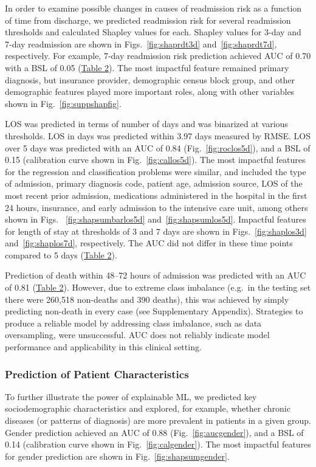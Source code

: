 In order to examine possible changes in causes of readmission risk as a function of time from discharge, 
we predicted readmission risk for several readmission thresholds and calculated Shapley values for each.\@
Shapley values for 3-day and 7-day readmission are shown in Figs.\ 
\ref{fig:shaprdt3d} and~\ref{fig:shaprdt7d}, respectively.\@
For example, 7-day readmission risk prediction achieved AUC of 0.70 %
with a BSL of 0.05 (\hyperref[table:table2]{Table 2}).\@
The most impactful feature remained primary diagnosis, %
but insurance provider, demographic census block group, 
and other demographic features played more important roles, %
along with other variables shown in Fig.\ \ref{fig:suppshapfig}.\@

LOS was predicted in terms of number of days and was binarized at various thresholds. 
LOS in days was predicted within 3.97 days measured by RMSE. 
LOS over 5 days was predicted with an AUC of 0.84 (Fig.\ \ref{fig:roclos5d}), 
and a BSL of 0.15 (calibration curve shown in Fig.\ \ref{fig:callos5d}).\@ 
The most impactful features for the regression and classification problems were similar, 
and included the type of admission, primary diagnosis code, patient age, admission source, 
LOS of the most recent prior admission, medications administered in the hospital in the first 24 hours, 
insurance, and early admission to the intensive care unit, 
among others shown in Figs. \ \ref{fig:shapsumbarlos5d} and~\ref{fig:shapsumlos5d}.\@
Impactful features for length of stay at thresholds of 3 and 7 days are shown in %
Figs.\ \ref{fig:shaplos3d} and~\ref{fig:shaplos7d}, respectively.\@ 
The AUC did not differ in these time points compared to 5 days (\hyperref[table:table2]{Table 2}).\@

Prediction of death within 48--72 hours of admission was predicted with an AUC of 0.81 (\hyperref[table:table2]{Table 2}). 
However, due to extreme class imbalance (e.g.\ in the testing set there were 260,518 non-deaths and 390 deaths), 
this was achieved by simply predicting non-death in every case (see Supplementary Appendix). 
Strategies to produce a reliable model by addressing class imbalance, such as data oversampling, were unsuccessful. 
AUC does not reliably indicate model performance and applicability in this clinical setting.

\subsubsection{Prediction of Patient Characteristics}
To further illustrate the power of explainable ML, 
we predicted key sociodemographic characteristics and explored, for example, 
whether chronic diseases (or patterns of diagnosis) are more prevalent in patients in a given group.
\subsubsubsection{{Gender}}
Gender prediction achieved an AUC of 0.88 (Fig.\ \ref{fig:aucgender}),\@
and a BSL of 0.14 (calibration curve shown in Fig.\ \ref{fig:calgender}).\@
The most impactful features for gender prediction are shown in Fig.\ \ref{fig:shapsumgender}.\@


